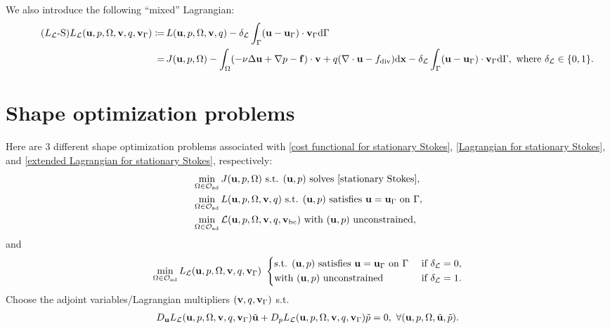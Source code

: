 \documentclass[oneside]{book}
\numberwithin{equation}{section}
\begin{document}
We also introduce the following ``mixed'' Lagrangian:
\begin{align}
    \label{mixed Lagrangian for stationary Stokes}
    \tag{$L_{\mathcal{L}}$-S}
    L_{\mathcal{L}}({\bf u},p,\Omega,{\bf v},q,{\bf v}_\Gamma)\coloneqq&\, L({\bf u},p,\Omega,{\bf v},q) - \delta_{\mathcal{L}}\int_\Gamma ({\bf u} - {\bf u}_\Gamma)\cdot{\bf v}_\Gamma{\rm d}\Gamma\\
    =&\, J({\bf u},p,\Omega) - \int_\Omega (-\nu\Delta{\bf u} + \nabla p - {\bf f})\cdot{\bf v} + q(\nabla\cdot{\bf u} - f_{\rm div}){\rm d}{\bf x} - \delta_{\mathcal{L}}\int_\Gamma ({\bf u} - {\bf u}_\Gamma)\cdot{\bf v}_\Gamma{\rm d}\Gamma, \mbox{ where } \delta_{\mathcal{L}}\in\{0,1\}.
\end{align}

\section{Shape optimization problems}
Here are 3 different shape optimization problems associated with \eqref{cost functional for stationary Stokes}, \eqref{Lagrangian for stationary Stokes}, and \eqref{extended Lagrangian for stationary Stokes}, respectively:
\begin{align*}
    &\min_{\Omega\in\mathcal{O}_{\rm ad}} J({\bf u},p,\Omega) \mbox{ s.t. } ({\bf u},p) \mbox{ solves \eqref{stationary Stokes}},\\
    &\min_{\Omega\in\mathcal{O}_{\rm ad}} L({\bf u},p,\Omega,{\bf v},q) \mbox{ s.t. } ({\bf u},p) \mbox{ satisfies } {\bf u} = {\bf u}_\Gamma \mbox{ on } \Gamma,\\
    &\min_{\Omega\in\mathcal{O}_{\rm ad}} \mathcal{L}({\bf u},p,\Omega,{\bf v},q,{\bf v}_{\rm bc}) \mbox{ with } ({\bf u},p) \mbox{ unconstrained},
\end{align*}
and
\begin{equation*}
    \min_{\Omega\in\mathcal{O}_{\rm ad}} L_{\mathcal{L}}({\bf u},p,\Omega,{\bf v},q,{\bf v}_\Gamma)\ \left\{\begin{split}
        &\mbox{s.t. } ({\bf u},p) \mbox{ satisfies } {\bf u} = {\bf u}_\Gamma \mbox{ on } \Gamma &&\mbox{ if } \delta_{\mathcal{L}} = 0,\\
        &\mbox{with } ({\bf u},p) \mbox{ unconstrained} &&\mbox{ if } \delta_{\mathcal{L}} = 1.
    \end{split}\right.
\end{equation*}
Choose the adjoint variables/Lagrangian multipliers $({\bf v},q,{\bf v}_\Gamma)$ s.t.
\begin{align*}
    D_{\bf u}L_{\mathcal{L}}({\bf u},p,\Omega,{\bf v},q,{\bf v}_\Gamma)\tilde{\bf u} + D_pL_{\mathcal{L}}({\bf u},p,\Omega,{\bf v},q,{\bf v}_\Gamma)\tilde{p} = 0,\ \forall({\bf u},p,\Omega,\tilde{\bf u},\tilde{p}).
\end{align*}
\end{document}
